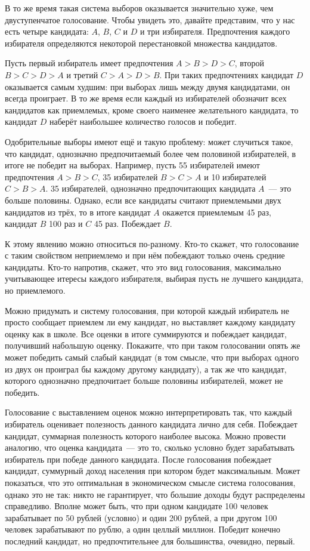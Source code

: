 В то же время такая система выборов оказывается значительно хуже, чем двуступенчатое голосование. Чтобы увидеть это, давайте представим, что у нас есть четыре кандидата: $A$, $B$, $C$ и $D$ и три избирателя. Предпочтения каждого избирателя определяются некоторой перестановкой множества кандидатов.

Пусть первый избиратель имеет предпочтения $A>B>D>C$, второй $B>C>D>A$ и третий $C>A>D>B$. При таких предпочтениях кандидат $D$ оказывается самым худшим: при выборах лишь между двумя кандидатами, он всегда проиграет. В то же время если каждый из избирателей обозначит всех кандидатов как приемлемых, кроме своего наименее желательного кандидата, то кандидат $D$ наберёт наибольшее количество голосов и победит.

Одобрительные выборы имеют ещё и такую проблему: может случиться такое, что кандидат, однозначно предпочитаемый более чем половиной избирателей, в итоге не победит на выборах. Например, пусть 55 избирателей имеют предпочтения $A>B>C$, 35 избирателей $B>C>A$ и 10 избирателей $C>B>A$. 35 избирателей, однозначно предпочитающих кандидата $A$~--- это больше половины. Однако, если все кандидаты считают приемлемыми двух кандидатов из трёх, то в итоге кандидат $A$ окажется приемлемым 45 раз, кандидат $B$ 100 раз и $C$ 45 раз. Побеждает $B$.

К этому явлению можно относиться по-разному. Кто-то скажет, что голосование с таким свойством неприемлемо и при нём побеждают только очень средние кандидаты. Кто-то напротив, скажет, что это вид голосования, максимально учитывающее итересы каждого избирателя, выбирая пусть не лучшего кандидата, но приемлемого.

\begin{exercise}
Можно придумать и систему голосования, при которой каждый избиратель не просто сообщает приемлем ли ему кандидат, но выставляет каждому кандидату оценку как в школе. Все оценки в итоге суммируются и побеждает кандидат, получивший набольшую оценку. Покажите, что при таком голосовании опять же может победить самый слабый кандидат (в том смысле, что при выборах одного из двух он проиграл бы каждому другому кандидату), а так же что кандидат, которого однозначно предпочитает больше половины избирателей, может не победить.
\end{exercise}

Голосование с выставлением оценок можно интерпретировать так, что каждый избиратель оценивает полезность данного кандидата лично для себя. Побеждает кандидат, суммарная полезность которого наиболее высока. Можно провести аналогию, что оценка кандидата~--- это то, сколько условно будет зарабатывать избиратель при победе данного кандидата. После голосования побеждает кандидат, суммурный доход населения при котором будет максимальным. Может показаться, что это оптимальная в экономическом смысле система голосования, однако это не так: никто не гарантирует, что большие доходы будут распределены справедливо. Вполне может быть, что при одном кандидате 100 человек зарабатывает по 50 рублей (условно) и один 200 рублей, а при другом 100 человек зарабатывают по рублю, а один целлый миллион. Победит конечно последний кандидат, но предпочтительнее для большинства, очевидно, первый.

